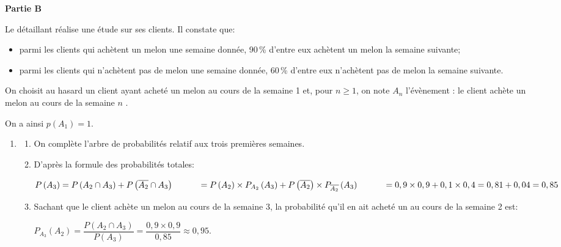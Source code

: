 \documentclass[10pt]{article}
\begin{document}
\bigskip

\textbf{Partie B}

\medskip

Le détaillant réalise une étude sur ses clients. Il constate que:

\begin{itemize}
\item parmi les clients qui achètent un melon une semaine donnée, 90\,\% d'entre eux achètent un
melon la semaine suivante;
\item parmi les clients qui n'achètent pas de melon une semaine donnée, 60\,\% d'entre eux n'achètent
pas de melon la semaine suivante.
\end{itemize}

\smallskip

On choisit au hasard un client ayant acheté un melon au cours de la semaine 1 et, pour $n \geqslant 1$, on
note $A_n$ l'évènement : \og le client achète un melon au cours de la semaine $n$ \fg.

On a ainsi $p\left(A_1\right) = 1$.

\medskip

\parbox{0.6\linewidth}{\begin{enumerate}
\item 
	\begin{enumerate}
		\item On complète l'arbre de probabilités relatif aux trois premières semaines.
		
		\item%
D'après la formule des probabilités totales:

$P\left(A_3\right) = P\left ( A_2 \cap A_3\right ) + P\left ( \overline{A_2} \cap A_3\right )\\
\phantom{P\left(A_3\right)}
= P\left (A_2\right ) \times P_{A_2} \left ( A_3\right ) +  P\left (\overline{A_2}\right ) \times P_{\overline{A_2}} \left ( A_3\right ) \\
\phantom{P\left(A_3\right)}
= 0,9\times 0,9 + 0,1\times 0,4 = 0,81+0,04=0,85$
		
		\item Sachant que le client achète un melon au cours de la semaine 3, la probabilité qu'il en ait acheté un au cours de la semaine 2 est:
		
$P_{A_3}\left (A_2\right ) = \dfrac{P\left (A_2\cap A_3\right )}{P\left (A_3\right )}
=\dfrac{0,9\times 0,9}{0,85} \approx 0,95$.
		
	\end{enumerate}
\end{enumerate}
}\hfill 
\parbox{0.31\linewidth}{
{
      {
      }
     {
     }
}
}
\medskip
	
\end{document}
